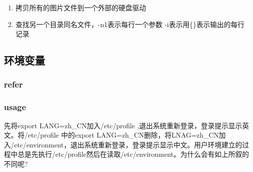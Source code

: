 \documentclass[a4paper,10pt,english]{sphinxmanual}
\begin{document}
\begin{enumerate}
\item {} 
拷贝所有的图片文件到一个外部的硬盘驱动

\begin{sphinxVerbatim}[commandchars=\\\{\}]
        
\end{sphinxVerbatim}

\item {} 
查找另一个目录同名文件，-n1表示每行一个参数 -i表示用\{\}表示输出的每行记录

\begin{sphinxVerbatim}[commandchars=\\\{\}]
       
\end{sphinxVerbatim}

\end{enumerate}


\subsection{环境变量}
\label{\detokenize{linux/shell:id15}}

\subsubsection{refer}
\label{\detokenize{linux/shell:refer}}


\subsubsection{usage}
\label{\detokenize{linux/shell:id16}}
先将export LANG=zh\_CN加入/etc/profile ,退出系统重新登录，登录提示显示英文。将/etc/profile 中的export LANG=zh\_CN删除，将LNAG=zh\_CN加入/etc/environment，退出系统重新登录，登录提示显示中文。用户环境建立的过程中总是先执行/etc/profile然后在读取/etc/environment。为什么会有如上所叙的不同呢?
\end{document}
